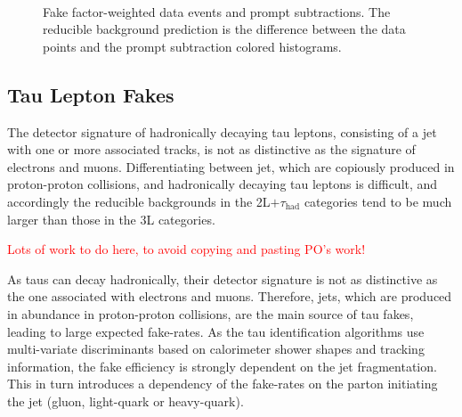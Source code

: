 \begin{figure}[h]
{	} \\
	\caption{Fake factor-weighted data events and prompt subtractions. The reducible background prediction is the difference between the data points and the prompt subtraction colored histograms.}
	\label{fig:prompt-subtractions}
\end{figure}

\subsection{Tau Lepton Fakes}\label{sec:model-independent-ff-tau}
The detector signature of hadronically decaying tau leptons, consisting of a jet with one or more associated tracks, is not as distinctive as the signature of electrons and muons. Differentiating between jet, which are copiously produced in proton-proton collisions, and hadronically decaying tau leptons is difficult, and accordingly the reducible backgrounds in the 2L$+\tau_{\mathrm{had}}$ categories tend to be much larger than those in the 3L categories. 

\textcolor{red}{Lots of work to do here, to avoid copying and pasting PO's work!}

As taus can decay hadronically, their detector signature is not as distinctive as the one
associated with electrons and muons.  Therefore, jets, which are produced in abundance in
proton-proton collisions, are the main source of tau fakes, leading to large expected
fake-rates.  As the tau identification algorithms use multi-variate discriminants based on
calorimeter shower shapes and tracking information, the fake efficiency is strongly
dependent on the jet fragmentation. This in turn introduces a dependency of the fake-rates
on the parton initiating the jet (gluon, light-quark or heavy-quark).

